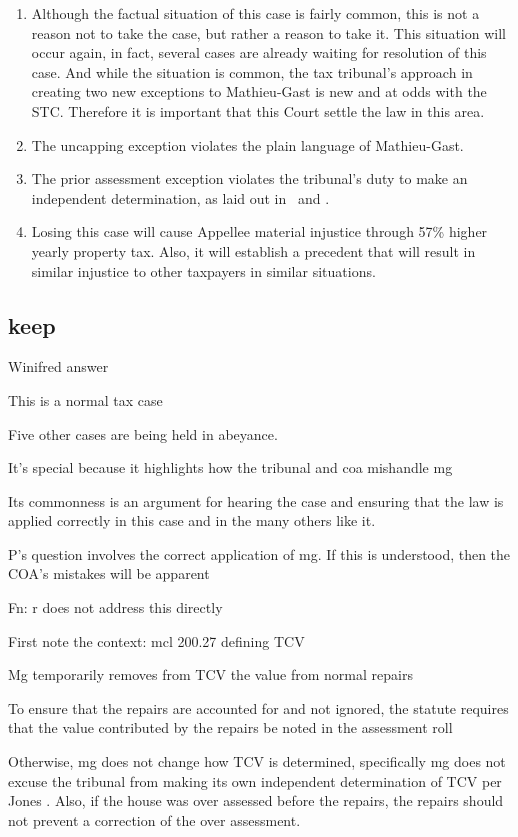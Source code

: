 \documentclass[12pt,\documentclassflag]{michiganCourtOfAppealsBrief}
\begin{document}
\begin{enumerate}
\item Although the factual situation of this case is fairly common, this is not a reason not to take the case, but rather a reason to take it. This situation will occur again, in fact, several cases are already waiting for resolution of this case. And while the situation is common, the tax tribunal's approach in creating two new exceptions to Mathieu-Gast is new and at odds with the STC. Therefore it is important that this Court settle the law in this area.
\item The uncapping exception violates the plain language of Mathieu-Gast.
\item The prior assessment exception violates the tribunal's duty to make an independent determination, as laid out in \cite{Jones & Laughlin}\ and \cite{Great Lakes Div of Nat'l Steel Corp}.
\item Losing this case will cause Appellee material injustice through 57\% higher yearly property tax. Also, it will establish a precedent that will result in similar injustice to other taxpayers in similar situations.
\end{enumerate}


\subsection{keep}
Winifred answer

This is a normal tax case

Five other cases are being held in abeyance.

It’s special because it highlights how the tribunal and coa mishandle mg

Its commonness is an argument for hearing the case and ensuring that the law is applied correctly in this case and in the many others like it.

P’s question involves the correct application of mg. If this is understood, then the COA’s mistakes will be apparent

Fn: r does not address this directly

First note the context: mcl 200.27 defining TCV

Mg temporarily removes from TCV the value from normal repairs

To ensure that the repairs are accounted for and not ignored, the statute requires that the value contributed by the repairs be noted in the assessment roll

Otherwise, mg does not change how TCV is determined, specifically mg does not excuse the tribunal from making its own independent determination of TCV per Jones . Also, if the house was over assessed before the repairs, the repairs should not prevent a correction of the over assessment.
\end{document}
